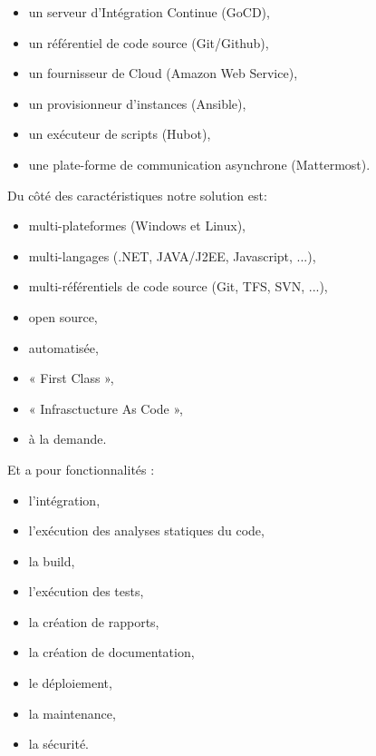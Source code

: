       \begin{itemize}
        \item un serveur d'Intégration Continue (GoCD),
        \item un référentiel de code source (Git/Github),
        \item un fournisseur de Cloud (Amazon Web Service),
        \item un provisionneur d'instances (Ansible),
        \item un exécuteur de scripts (Hubot),
        \item une plate-forme de communication asynchrone (Mattermost).\\
      \end{itemize}

      Du côté des caractéristiques notre solution est:\\

      \begin{itemize}
        \item multi-plateformes (Windows et Linux),
        \item multi-langages (.NET, JAVA/J2EE, Javascript, ...),
        \item multi-référentiels de code source (Git, TFS, SVN, ...),
        \item open source,
        \item automatisée,
        \item « First Class »,
        \item « Infrasctucture As Code »,
        \item à la demande.
      \end{itemize}

      Et a pour fonctionnalités :\\

      \begin{itemize}
        \item l'intégration,
        \item l'exécution des analyses statiques du code,
        \item la build,
        \item l'exécution des tests,
        \item la création de rapports,
        \item la création de documentation,
        \item le déploiement,
        \item la maintenance,
        \item la sécurité.\\
      \end{itemize}

